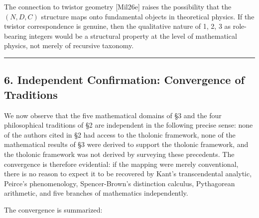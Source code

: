 \documentclass[
  11pt,
  letterpaper,
]{article}
\begin{document}
The connection to twistor geometry {[}Mil26e{]} raises the possibility
that the \((N, D, C)\) structure maps onto fundamental objects in
theoretical physics. If the twistor correspondence is genuine, then the
qualitative nature of 1, 2, 3 as role-bearing integers would be a
structural property at the level of mathematical physics, not merely of
recursive taxonomy.

\begin{center}\rule{0.5\linewidth}{0.5pt}\end{center}

\subsection{6. Independent Confirmation: Convergence of
Traditions}\label{independent-confirmation-convergence-of-traditions}

We now observe that the five mathematical domains of §3 and the four
philosophical traditions of §2 are independent in the following precise
sense: none of the authors cited in §2 had access to the tholonic
framework, none of the mathematical results of §3 were derived to
support the tholonic framework, and the tholonic framework was not
derived by surveying these precedents. The convergence is therefore
evidential: if the mapping were merely conventional, there is no reason
to expect it to be recovered by Kant's transcendental analytic, Peirce's
phenomenology, Spencer-Brown's distinction calculus, Pythagorean
arithmetic, and five branches of mathematics independently.

The convergence is summarized:
\end{document}

